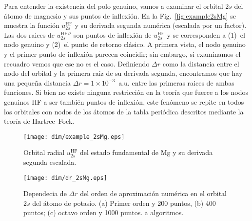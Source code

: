 Para entender la existencia del polo genuino, vamos a examinar el 
orbital $2s$ del átomo de magnesio y sus puntos de inflexión. En la 
Fig.~\ref{fig:example2sMg} se muestra la función $u_{2s}^{\mathrm{HF}}$ 
y su derivada segunda numérica (escalada por un factor). Las dos raices 
de $u_{2s}^{\mathrm{HF}}''$ son puntos de inflexión de 
$u_{2s}^{\mathrm{HF}}$ y se corresponden a (1)~el nodo genuino y (2)~el 
punto de retorno clásico. A primera vista, el nodo genuino y el primer 
punto de inflexión parecen coincidir; sin embargo, si examinamos el 
recuadro vemos que ese no es el caso. Definiendo $\Delta r$ como la 
distancia entre el nodo del orbital y la primera raiz de su derivada 
segunda, encontramos que hay una pequeña distancia 
$\Delta r=1\times 10^{-3}$~a.u. entre las primeras raices de ambas 
funciones. Si bien no existe ninguna restricción en la teoría que fuerce 
a los nodos genuinos HF a ser también puntos de inflexión, este fenómeno 
se repite en todos los orbitales con nodos de los átomos de la tabla 
periódica descritos mediante la teoría de Hartree--Fock. 

\begin{figure}
\vspace{-0.4cm}
\centering
\texttt{[image: dim/example\_2sMg.eps]} 
\vspace{-0.45cm}
\caption[Orbital radial y su derivada segunda.]
{Orbital radial $u_{2s}^{\mathrm{HF}}$ del estado fundamental de Mg y su 
derivada segunda escalada.}
\label{fig:example2sMg}

\vspace{0.4cm}
\texttt{[image: dim/dr\_2sMg.eps]} 
\vspace{-0.45cm}
\caption[Dependecia de $\Delta r$ del orden de aproximación numérica.]
{Dependecia de $\Delta r$ del orden de aproximación numérica en el 
orbital $2s$ del átomo de potasio. (a) Primer orden y 200 puntos, (b) 400 puntos; (c) octavo orden y 1000 puntos.
a algoritmos.}
\label{fig:dr2sMg}
\end{figure}

